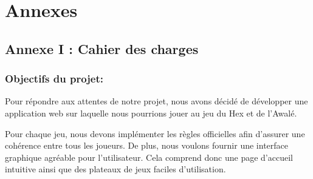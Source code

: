 \section{Annexes}



\vspace{0.3cm}
\subsection{Annexe I : Cahier des charges}
\vspace{0.3cm}
\subsubsection*{Objectifs du projet:}
Pour répondre aux attentes de notre projet, nous avons décidé de développer une application web sur laquelle 
nous pourrions jouer au jeu du Hex et de l'Awalé.

Pour chaque jeu, nous devons implémenter les règles officielles afin d'assurer une cohérence
entre tous les joueurs. De plus, nous voulons fournir une interface graphique agréable pour l'utilisateur. 
Cela comprend donc une page d'accueil intuitive ainsi que des plateaux de jeux faciles d'utilisation.


